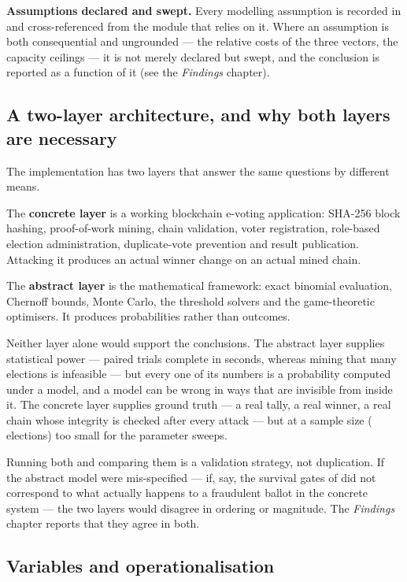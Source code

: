 \textbf{Assumptions declared and swept.} Every modelling assumption is
recorded in  and cross-referenced from the module
that relies on it. Where an assumption is both consequential and
ungrounded --- the relative costs of the three vectors, the capacity
ceilings --- it is not merely declared but swept, and the conclusion is
reported as a function of it (see the \emph{Findings} chapter).

\subsection{A two-layer architecture, and why both layers are necessary}
\label{sec:method-twolayer}

The implementation has two layers that answer the same questions by
different means.

The \textbf{concrete layer} is a working blockchain e-voting
application: SHA-256 block hashing, proof-of-work mining, chain
validation, voter registration, role-based election administration,
duplicate-vote prevention and result publication. Attacking it produces
an actual winner change on an actual mined chain.

The \textbf{abstract layer} is the mathematical framework: exact
binomial evaluation, Chernoff bounds, Monte Carlo, the threshold
solvers and the game-theoretic optimisers. It produces probabilities
rather than outcomes.

Neither layer alone would support the conclusions. The abstract layer
supplies statistical power --- \TotalTrials{} paired trials complete in
\RuntimeSeconds{} seconds, whereas mining that many elections is
infeasible --- but every one of its numbers is a probability computed
under a model, and a model can be wrong in ways that are invisible from
inside it. The concrete layer supplies ground truth --- a real tally, a
real winner, a real chain whose integrity is checked after every attack
--- but at a sample size (\ElectionTrials{} elections) too small for
the parameter sweeps.

Running both and comparing them is a validation strategy, not
duplication. If the abstract model were mis-specified --- if, say, the
survival gates of  did not correspond to what
actually happens to a fraudulent ballot in the concrete system --- the
two layers would disagree in ordering or magnitude.
The \emph{Findings} chapter reports that they agree in both.

\subsection{Variables and operationalisation}


